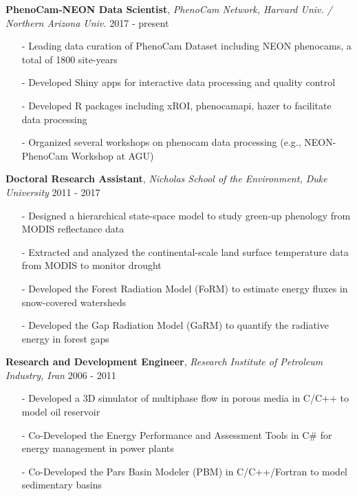 \documentclass[10pt]{article}
\newenvironment{changemargin}[2]{%
  \begin{list}{}{%
 \setlength{\topsep}{0pt}%
 \setlength{\leftmargin}{#1}%
 \setlength{\rightmargin}{#2}%
 \setlength{\listparindent}{\parindent}%
 \setlength{\itemindent}{\parindent}%
 \setlength{\parsep}{\parskip}%
  }%
  \item[]}{\end{list}
}
\newenvironment{body} {
  \vspace*{-2pt}
  \begin{changemargin}{-0.5in}{-0.5in}
}
{\end{changemargin}
}
\begin{document}
\begin{body}

  \textbf{PhenoCam-NEON Data Scientist}, \emph{PhenoCam Network, Harvard Univ. / Northern Arizona Univ.} \hfill {2017 - present}\\
	\vspace*{-4pt}
	\begin{itemize} \itemsep -0pt  %
  	  \item[-] Leading data curation of PhenoCam Dataset including NEON phenocams, a total of 1800 site-years
  	  \item[-] Developed Shiny apps for interactive data processing and quality control
  	  \item[-] Developed R packages including xROI, phenocamapi, hazer to facilitate data processing
  	  \item[-] Organized several workshops on phenocam data processing (e.g., NEON-PhenoCam Workshop at AGU)
	\end{itemize}
  \smallskip

	\textbf{Doctoral Research Assistant}, \emph{Nicholas School of the Environment, Duke University} \hfill {2011 - 2017}\\
	\vspace*{-4pt}
	\begin{itemize} \itemsep -0pt  %
	  \item[-] Designed a hierarchical state-space model to study green-up phenology from MODIS reflectance data
		\item[-] Extracted and analyzed the continental-scale land surface temperature data from MODIS to monitor drought
		\item[-] Developed the Forest Radiation Model (FoRM) to estimate energy fluxes in snow-covered watersheds
		\item[-] Developed the Gap Radiation Model (GaRM) to quantify the radiative energy in forest gaps
	\end{itemize}
  \smallskip

	\textbf {Research and Development Engineer}, \emph{Research Institute of Petroleum Industry, Iran} \hfill {2006 - 2011}\\
	\vspace*{-4pt}
	\begin{itemize} \itemsep -0pt
		\item[-] Developed a 3D simulator of multiphase flow in porous media in C/C++ to model oil reservoir
		\item[-] Co-Developed the Energy Performance and Assessment Tools in C\# for energy management in power plants
		\item[-] Co-Developed the Pars Basin Modeler (PBM) in C/C++/Fortran to model sedimentary basins
	\end{itemize}
	
		
\end{body}
\smallskip
\end{document}
